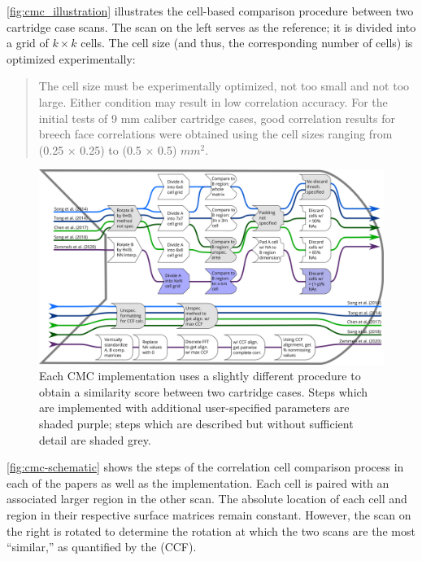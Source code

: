 \autoref{fig:cmc_illustration} illustrates the cell-based comparison
procedure between two cartridge case scans. The scan on the left serves
as the reference; it is divided into a grid of \(k \times k\) cells. The
cell size (and thus, the corresponding number of cells) is optimized
experimentally:

\begin{quote}
The cell size must be experimentally optimized, not too small and not
too large. Either condition may result in low correlation accuracy. For
the initial tests of 9 mm caliber cartridge cases, good correlation
results for breech face correlations were obtained using the cell sizes
ranging from (0.25 × 0.25) to (0.5 × 0.5) \(mm^2\). \citep{song_3d_2014}
\end{quote}

\begin{figure}
\includegraphics[width=\textwidth]{images/cmc_flow.png}
\caption{Each CMC implementation uses a slightly different procedure to obtain a similarity score between two cartridge cases. Steps which are implemented with additional user-specified parameters are shaded purple; steps which are described but without sufficient detail are shaded grey.}\label{fig:cmc-schematic}
\end{figure}

\autoref{fig:cmc-schematic} shows the steps of the correlation cell
comparison process in each of the papers as well as the 
implementation. Each cell is paired with an associated larger region in
the other scan. The absolute location of each cell and region in their
respective surface matrices remain constant. However, the scan on the
right is rotated to determine the rotation at which the two scans are
the most ``similar,'' as quantified by the
 (CCF).

